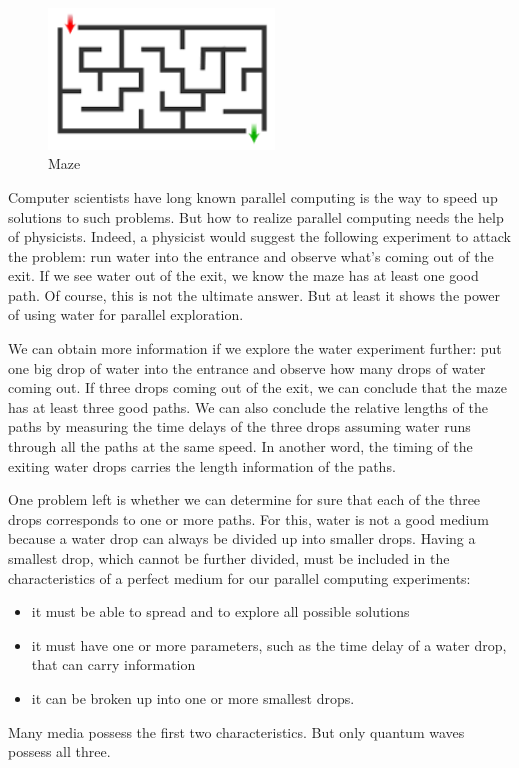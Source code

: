 \documentclass{book}
\begin{document}
\begin{figure}[ht]
\includegraphics[width=6cm]{pic/maze.png}
\caption{Maze}
\label{Maze}
\end{figure}

Computer scientists have long known parallel computing is the way to speed up solutions to such problems. But how to realize parallel computing needs the help of physicists. Indeed, a physicist would suggest the following experiment to attack the problem: run water into the entrance and observe what's coming out of the exit. If we see water out of the exit, we know the maze has at least one good path. Of course, this is not the ultimate answer. But at least it shows the power of using water for parallel exploration.

We can obtain more information if we explore the water experiment further: put one big drop of water into the entrance and observe how many drops of water coming out. If three drops coming out of the exit, we can conclude that the maze has at least three good paths. We can also conclude the relative lengths of the paths by measuring the time delays of the three drops assuming water runs through all the paths at the same speed. In another word, the timing of the exiting water drops carries the length information of the paths.

One problem left is whether we can determine for sure that each of the three drops corresponds to one or more paths. For this, water is not a good medium because a water drop can always be divided up into smaller drops. Having a smallest drop, which cannot be further divided, must be included in the characteristics of a perfect medium for our parallel computing experiments:
\begin{itemize}
    \item it must be able to spread and to explore all possible solutions
    \item it must have one or more parameters, such as the time delay of a water drop, that can carry information
    \item it can be broken up into one or more smallest drops.
\end{itemize}
Many media possess the first two characteristics. But only quantum waves possess all three.
\end{document}

